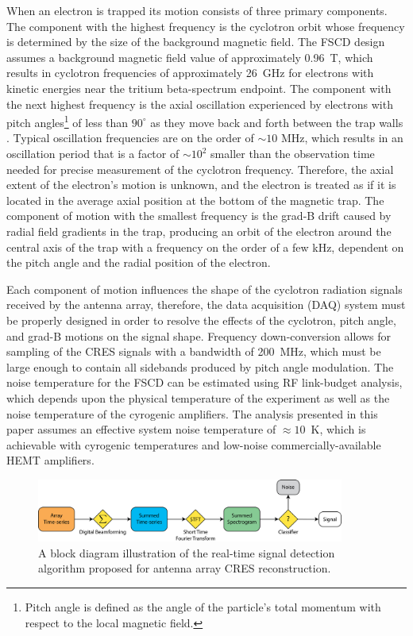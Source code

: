 When an electron is trapped its motion consists of three primary components. The component with the highest frequency is the cyclotron orbit whose frequency is determined by the size of the background magnetic field. The FSCD design assumes a background magnetic field value of approximately 0.96~T, which results in cyclotron frequencies of approximately 26~GHz for electrons with kinetic energies near the tritium beta-spectrum endpoint. The component with the next highest frequency is the axial oscillation experienced by electrons with pitch angles\footnote{Pitch angle is defined as the angle of the particle's total momentum with respect to the local magnetic field.} of less than $90^\circ$ as they move back and forth between the trap walls \cite{p8pheno}. Typical oscillation frequencies are on the order of $\sim10$ MHz, which results in an oscillation period that is a factor of $\sim10^2$ smaller than the observation time needed for precise measurement of the cyclotron frequency. Therefore, the axial extent of the electron's motion is unknown, and the electron is treated as if it is located in the average axial position at the bottom of the magnetic trap. The component of motion with the smallest frequency is the grad-B drift caused by radial field gradients in the trap, producing an orbit of the electron around the central axis of the trap with a frequency on the order of a few kHz, dependent on the pitch angle and the radial position of the electron. 

Each component of motion influences the shape of the cyclotron radiation signals received by the antenna array, therefore, the data acquisition (DAQ) system must be properly designed in order to resolve the effects of the cyclotron, pitch angle, and grad-B motions on the signal shape. Frequency down-conversion allows for sampling of the CRES signals with a bandwidth of 200~MHz, which must be large enough to contain all sidebands produced by pitch angle modulation. The noise temperature for the FSCD can be estimated using RF link-budget analysis, which depends upon the physical temperature of the experiment as well as the noise temperature of the cyrogenic amplifiers. The analysis presented in this paper assumes an effective system noise temperature of $\approx 10$~K, which is achievable with cyrogenic temperatures and low-noise commercially-available HEMT amplifiers.


\begin{figure}[htbp]
    \centering
    \includegraphics[width=0.9\textwidth]{figs/Chapter-4/230807_trigger_flow.png}
    \caption{A block diagram illustration of the real-time signal detection algorithm proposed for antenna array CRES reconstruction.}
    \label{fig:signal_detection_routine}
\end{figure}

